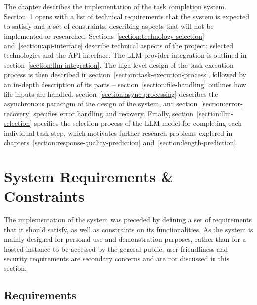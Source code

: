 \documentclass[a4paper,11pt,twoside]{report}
\theoremstyle{definition}
\begin{document}
The chapter describes the implementation of the task completion system. Section~\ref{section:requirements-and-constraints} opens with a list of technical requirements that the system is expected to satisfy and a set of constraints, describing aspects that will not be implemented or researched. Sections~\ref{section:technology-selection} and~\ref{section:api-interface} describe technical aspects of the project: selected technologies and the API interface. The LLM provider integration is outlined in section~\ref{section:llm-integration}. The high-level design of the task execution process is then described in section~\ref{section:task-execution-process}, followed by an in-depth description of its parts -- section~\ref{section:file-handling} outlines how file inputs are handled, section~\ref{section:async-processing} describes the asynchronous paradigm of the design of the system, and section~\ref{section:error-recovery} specifies error handling and recovery. Finally, section~\ref{section:llm-selection} specifies the selection process of the LLM model for completing each individual task step, which motivates further research problems explored in chapters~\ref{section:response-quality-prediction} and~\ref{section:length-prediction}.

\section{System Requirements \& Constraints}
\label{section:requirements-and-constraints}

The implementation of the system was preceded by defining a set of requirements that it should satisfy, as well as constraints on its functionalities. As the system is mainly designed for personal use and demonstration purposes, rather than for a hosted instance to be accessed by the general public, user-friendliness and security requirements are secondary concerns and are not discussed in this section.

\subsection{Requirements}
\label{section:requirements}
\end{document}
